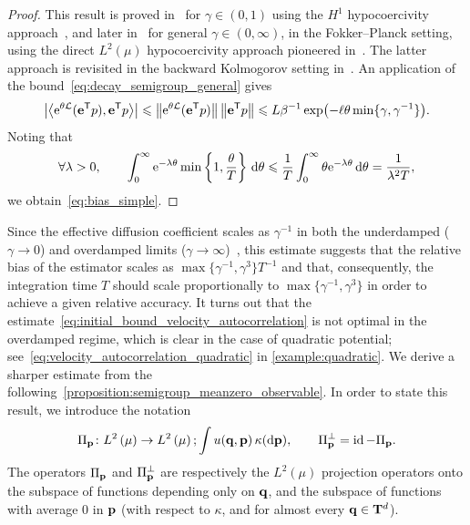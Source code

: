 \documentclass[11pt,a4paper]{article}
\begin{document}
\begin{proof}
This result is proved in~\cite{MR2394704} for $\gamma \in (0, 1)$ using the $H^1$ hypocoercivity approach~\cite{MR2562709},
and later in~\cite{MR3106879} for general $\gamma \in (0, \infty)$, in the Fokker--Planck setting,
using the direct $L^2(\mu)$ hypocoercivity approach pioneered in~\cite{Herau06,MR2576899,MR3324910}.
The latter approach is revisited in the backward Kolmogorov setting in~\cite{MR3522857,roussel2018spectral}.
An application of the bound~\eqref{eq:decay_semigroup_general} gives
\begin{equation}
    \label{eq:initial_bound_velocity_autocorrelation}
    \left\lvert \ip{\e^{\theta \mathcal L}(\vect e^\t p)}{\vect e^\t p} \right\rvert
    \leq \norm{\e^{\theta \mathcal L}(\vect e^\t p)} \norm{\vect e^\t p}
    \leq L \beta^{-1} \exp\bigl(- \ell \theta \min\{\gamma, \gamma^{-1}\}\bigr).
\end{equation}
Noting that
\begin{equation}
    \label{eq:petit_calcul}
    \forall \lambda > 0, \qquad
    \int_{0}^{\infty} \mathrm{e}^{-\lambda \theta} \min\left\{ 1, \frac{\theta}{T} \right\} \, \mathrm d \theta
    \leqslant \frac{1}{T} \int_{0}^{\infty} \theta \mathrm{e}^{-\lambda \theta} \, \mathrm d \theta = \frac{1}{\lambda^2 T},
\end{equation}
we obtain~\eqref{eq:bias_simple}.
\end{proof}
Since the effective diffusion coefficient scales as $\gamma^{-1}$ in both the underdamped ($\gamma \to 0$) and overdamped limits ($\gamma \to \infty$)~\cite{MR2394704,MR2427108},
this estimate suggests that the relative bias of the estimator scales as $\max\{\gamma^{-1}, \gamma^3\} T^{-1}$ and that,
consequently, the integration time $T$ should scale proportionally to $\max\{\gamma^{-1}, \gamma^3\}$ in order to achieve a given relative accuracy.
It turns out that the estimate~\eqref{eq:initial_bound_velocity_autocorrelation} is not optimal in the overdamped regime,
which is clear in the case of quadratic potential; see~\eqref{eq:velocity_autocorrelation_quadratic} in \cref{example:quadratic}.
We derive a sharper estimate from the following~\cref{proposition:semigroup_meanzero_observable}.
In order to state this result,
we introduce the notation
\[
    \Pi_{\vect p}\colon \lp{2}{\mu} \rightarrow \lp{2}{\mu}; \int u(\vect q, \vect p) \, \kappa(\d \vect p),
    \qquad  \Pi_{\vect p}^\perp = \id - \Pi_{\vect p}.
\]
The operators $\Pi_{\boldsymbol{\mathbf p}}$ and $\Pi_{\boldsymbol{\mathbf p}}^\perp$ are respectively the $L^2(\mu)$ projection operators onto
the subspace of functions depending only on $\boldsymbol{\mathbf q}$,
and the subspace of functions with average $0$ in $\boldsymbol{\mathbf p}$ (with respect to $\kappa$, and for almost every $\boldsymbol{\mathbf q} \in \mathbf T^d$).
\end{document}
